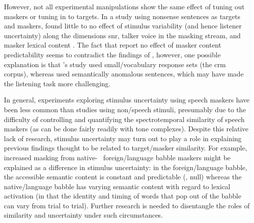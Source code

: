 However, not all experimental manipulations show the same effect of tuning out maskers or tuning in to targets.  In a study using nonsense sentences as targets and maskers, \citeauthor*{FreymanEtAl2007} found little to no effect of stimulus variability (and hence listener uncertainty) along the dimensions \ac{snr}, talker voice in the masking stream, and masker lexical content \citep{FreymanEtAl2007}.  The fact that \citeauthor*{FreymanEtAl2007} report no effect of masker content predictability seems to contradict the findings of \citet{BrungartSimpson2004}, however, one possible explanation is that \citeauthor*{BrungartSimpson2004}’s study used small\-/vocabulary response sets (the \ac{crm} corpus), whereas \citeauthor*{FreymanEtAl2007} used semantically anomalous sentences, which may have made the listening task more challenging.  

In general, experiments exploring stimulus uncertainty using speech maskers have been less common than studies using non\-/speech stimuli, presumably due to the difficulty of controlling and quantifying the spectrotemporal similarity of speech maskers (as can be done fairly readily with tone complexes).  Despite this relative lack of research, stimulus uncertainty may turn out to play a role in explaining previous findings thought to be related to target\-/masker similarity.  For example, increased masking from native- \vs\ foreign\-/language babble maskers \citep[\eg,][]{RhebergenEtAl2005, GarciaLecumberriCooke2006, VanEngenBradlow2007, BrouwerEtAl2012} might be explained as a difference in stimulus uncertainty: in the foreign\-/language babble, the accessible semantic content is constant and predictable (\ie, null) whereas the native\-/language babble has varying semantic content with regard to lexical activation (in that the identity and timing of words that pop out of the babble can vary from trial to trial).  Further research is needed to disentangle the roles of similarity and uncertainty under such circumstances.  %

